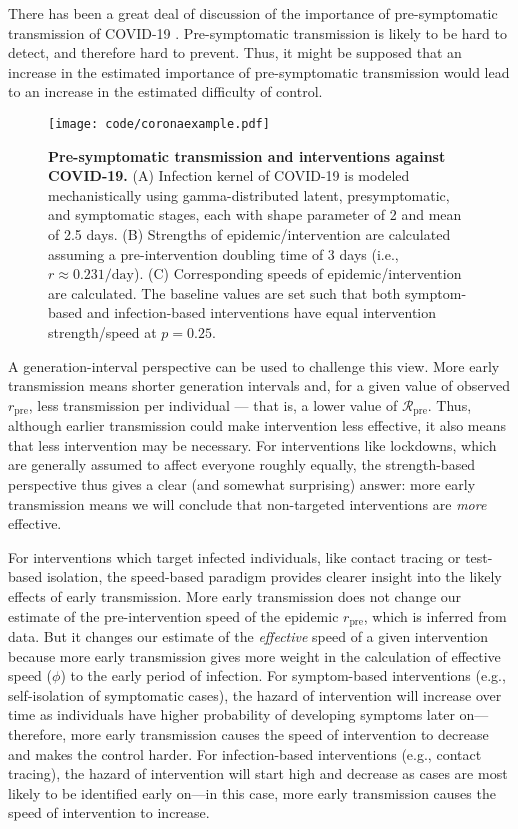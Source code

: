 \documentclass[12pt]{article}
\newcommand{\RR}{\ensuremath{{\mathcal R}}}
\newcommand{\Rx}[1]{\ensuremath{\RR_{\mathrm{#1}}}}
\newcommand{\Rpre}{\Rx{pre}}
\newcommand{\rr}{\ensuremath{{r}}}
\newcommand{\rx}[1]{\ensuremath{\rr_{\mathrm{#1}}}}
\newcommand{\rpre}{\rx{pre}}
\newcommand{\figlab}[1]{\label{fig:#1}}
\begin{document}
There has been a great deal of discussion of the importance of pre-symptomatic transmission of COVID-19 \cite{ferretti2020quantifying, he2020temporal, hellewell2020feasibility}. 
Pre-symptomatic transmission is likely to be hard to detect, and therefore hard to prevent. 
Thus, it might be supposed that an increase in the estimated importance of pre-symptomatic transmission would lead to an increase in the estimated difficulty of control.

\begin{figure}
\texttt{[image: code/coronaexample.pdf]}
\caption{
\textbf{Pre-symptomatic transmission and interventions against COVID-19.}
(A) Infection kernel of COVID-19 is modeled mechanistically using gamma-distributed latent, presymptomatic, and symptomatic stages, each with shape parameter of 2 and mean of 2.5 days.
(B) Strengths of epidemic/intervention are calculated assuming a pre-intervention doubling time of 3 days (i.e., $r \approx 0.231/\mathrm{day}$).
(C) Corresponding speeds of epidemic/intervention are calculated.
The baseline values are set such that both symptom-based and infection-based interventions have equal intervention strength/speed at $p=0.25$.
}
\figlab{covid}
\end{figure}

A generation-interval perspective \cite{park2019practical} can be used to challenge this view.
More early transmission means shorter generation intervals and, for a given value of observed \rpre, less transmission per individual --- that is, a lower value of \Rpre.
Thus, although earlier transmission could make intervention less effective, it also means that less intervention may be necessary. For interventions like lockdowns, which are generally assumed to affect everyone roughly equally, the strength-based perspective thus gives a clear (and somewhat surprising) answer: more early transmission means we will conclude that non-targeted interventions are \emph{more} effective.

For interventions which target infected individuals, like contact tracing or test-based isolation, the speed-based paradigm provides clearer insight into the likely effects of early transmission.
More early transmission does not change our estimate of the pre-intervention speed of the epidemic \rpre, which is inferred from data. 
But it changes our estimate of the \emph{effective} speed of a given intervention because more early transmission gives more weight in the calculation of effective speed ($\phi$) to the early period of infection.
For symptom-based interventions (e.g., self-isolation of symptomatic cases), the hazard of intervention will increase over time as individuals have higher probability of developing symptoms later on---therefore, more early transmission causes the speed of intervention to decrease and makes the control harder.
For infection-based interventions (e.g., contact tracing), the hazard of intervention will start high and decrease as cases are most likely to be identified early on---in this case, more early transmission causes the speed of intervention to increase.
\end{document}
